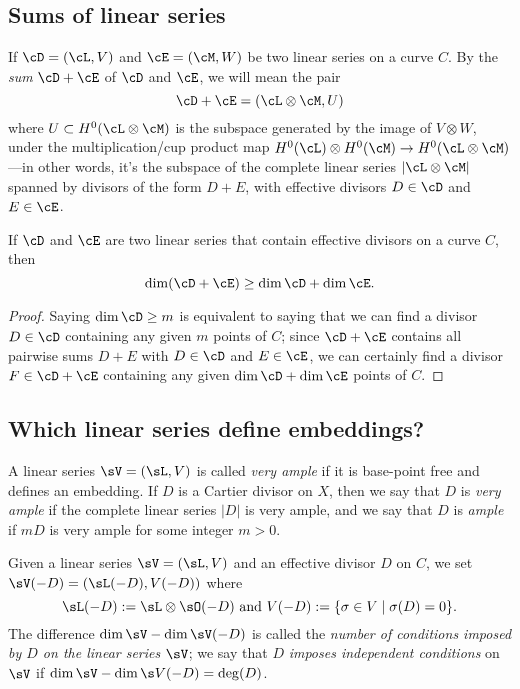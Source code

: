 \subsection{Sums of linear series}
If
$\cD = (\cL,V)$ and $\cE = (\cM, W)$ be two linear series on a curve $C$. By the \emph{sum} $\cD + \cE$ of $\cD$ and $\cE$, we will mean the pair 
$$
\cD + \cE = (\cL \otimes \cM, U) 
$$
where $U \subset H^0(\cL \otimes \cM)$ is the subspace generated by the image of $V \otimes W$, under the multiplication/cup product map $H^0(\cL) \otimes H^0(\cM) \to H^0(\cL \otimes \cM)$---in other words, it's the subspace of the complete linear series $|\cL\otimes \cM|$ spanned by divisors of the form $D+E$, with effective divisors $D \in \cD$ and $E \in \cE$.
 
 
\begin{proposition}\label{sum of linear series}
 If $\cD$ and $\cE$ are two  linear series that contain effective divisors on a curve $C$, then
$$
\dim(\cD + \cE) \geq \dim \cD + \dim \cE.
$$
\end{proposition}
\begin{proof}
Saying $\dim \cD \geq m$ is equivalent to saying that we can find a divisor $D \in \cD$ containing any given $m$ points of $C$; since $\cD + \cE$ contains all pairwise sums $D + E$ with $D \in \cD$ and $E \in \cE$, we can certainly find a divisor $F \in \cD + \cE$ containing any given $\dim \cD + \dim \cE$ points of $C$.
\end{proof}

\subsection{Which linear series define embeddings?}

A linear series $\sV = (\sL, V)$ is called  \emph{very ample}  if it is base-point free and defines an embedding. If $D$ is a Cartier divisor on $X$, then we say that $D$ is \emph{very ample} if the complete linear series $|D|$ is very ample, and we say that $D$ is \emph{ample} if $mD$ is very ample for some integer $m>0$.

Given a linear series $\sV = (\sL, V)$ and an effective divisor $D$ on $C$, we  set
$
\sV(-D) = (\sL(-D),V(-D))
$
where
$$
\sL(-D): = \sL \otimes \sO(-D)\hbox{ and } V(-D) := \{ \sigma \in V \mid \sigma(D) = 0 \}.
$$
The difference $\dim \sV - \dim \sV(-D)$ is called the \emph{number of conditions imposed by $D$ on the linear series $\sV$}; we say that $D$ \emph{imposes independent conditions} on $\sV$ if $\dim \sV - \dim \s V(-D) = \deg(D)$.


